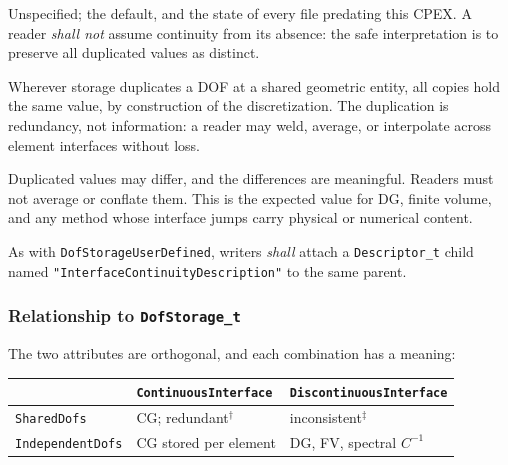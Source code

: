 \documentclass[11pt,letterpaper]{article}
\begin{document}
\begin{description}[leftmargin=2em]
\item[\texttt{InterfaceContinuityNull}] Unspecified; the default, and
  the state of every file predating this CPEX.  A reader
  \emph{shall not} assume continuity from its absence: the safe
  interpretation is to preserve all duplicated values as distinct.

\item[\texttt{ContinuousInterface}] Wherever storage duplicates a DOF at
  a shared geometric entity, all copies hold the same value, by
  construction of the discretization.  The duplication is redundancy,
  not information: a reader may weld, average, or interpolate across
  element interfaces without loss.

\item[\texttt{DiscontinuousInterface}] Duplicated values may differ, and
  the differences are meaningful.  Readers must not average or conflate
  them.  This is the expected value for DG, finite volume, and any
  method whose interface jumps carry physical or numerical content.

\item[\texttt{InterfaceContinuity\allowbreak UserDefined}] As with
  \texttt{DofStorageUserDefined}, writers \emph{shall} attach a
  \texttt{Descriptor\_t} child named
  \texttt{"InterfaceContinuity\allowbreak Description"} to the same
  parent.
\end{description}

\subsubsection{Relationship to \texttt{DofStorage\_t}}

The two attributes are orthogonal, and each combination has a meaning:

\begin{center}
\begin{tabular}{l l l}
\toprule
& \textbf{\texttt{ContinuousInterface}}
& \textbf{\texttt{DiscontinuousInterface}} \\
\midrule
\texttt{SharedDofs}      & CG; redundant$^{\dagger}$
                                 & inconsistent$^{\ddagger}$ \\
\texttt{IndependentDofs} & CG stored per element
                                 & DG, FV, spectral $C^{-1}$ \\
\bottomrule
\end{tabular}
\end{center}
\end{document}

